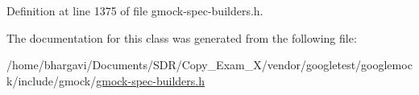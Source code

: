 Definition at line 1375 of file gmock-\/spec-\/builders.\+h.



The documentation for this class was generated from the following file\+:\begin{DoxyCompactItemize}
\item 
/home/bhargavi/\+Documents/\+S\+D\+R/\+Copy\+\_\+\+Exam\+\_\+X/vendor/googletest/googlemock/include/gmock/\hyperlink{gmock-spec-builders_8h}{gmock-\/spec-\/builders.\+h}\end{DoxyCompactItemize}
